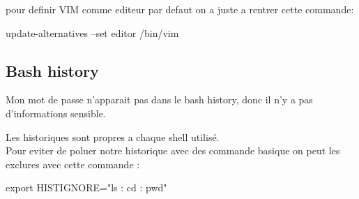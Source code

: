 \documentclass{article}
\begin{document}
 pour definir VIM comme editeur par defaut on a juste a rentrer cette commande: \par update-alternatives --set editor /bin/vim
 
 \subsection{\large{Bash history}}
 Mon mot de passe n'apparait pas dans le bash history, donc il n'y a pas d'informations sensible.\par
 Les historiques sont propres a chaque shell utilisé. \\
 
 Pour eviter de poluer notre historique avec des commande basique on peut les exclures avec cette commande : \par
 export HISTIGNORE="ls : cd : pwd"
 
 
 
\end{document}
